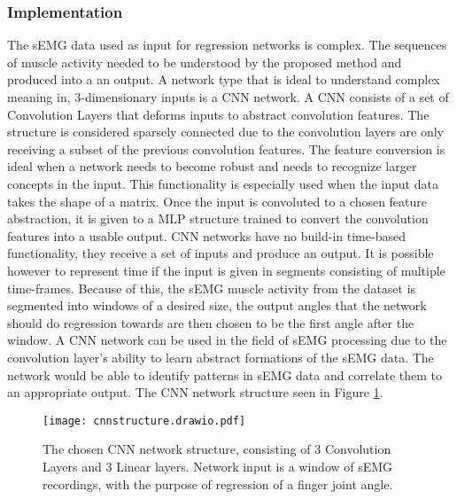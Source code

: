 \documentclass[../main.tex]{subfiles}
\begin{document}
\subsubsection{Implementation}

The sEMG data used as input for regression networks is complex.
The sequences of muscle activity needed to be understood by the proposed method and produced into a an output.
A network type that is ideal to understand complex meaning in, 3-dimensionary inputs is a CNN network.
A CNN consists of a set of Convolution Layers that deforms inputs to abstract convolution features.
The structure is considered sparsely connected due to the convolution layers are only receiving a subset of the previous convolution features.
The feature conversion is ideal when a network needs to become robust and needs to recognize larger concepts in the input.
This functionality is especially used when the input data takes the shape of a matrix.
Once the input is convoluted to a chosen feature abstraction, it is given to a MLP structure trained to convert the convolution features into a usable output.
CNN networks have no build-in time-based functionality, they receive a set of inputs and produce an output.
It is possible however to represent time if the input is given in segments consisting of multiple time-frames.
Because of this, the sEMG muscle activity from the dataset is segmented into windows of a desired size, the output angles that the network should do regression towards are then chosen to be the first angle after the window.
A CNN network can be used in the field of sEMG processing due to the convolution layer's ability to learn abstract formations of the sEMG data.
The network would be able to identify patterns in sEMG data and correlate them to an appropriate output.
The CNN network structure seen in Figure \ref{fig:cnn_structure}.

\begin{figure}[H]
\begin{center}
\texttt{[image: cnnstructure.drawio.pdf]}
\caption{The chosen CNN network structure, consisting of 3 Convolution Layers and 3 Linear layers. Network input is a window of sEMG recordings, with the purpose of regression of a finger joint angle.}
\label{fig:cnn_structure}
\end{center}
\end{figure}
\end{document}
